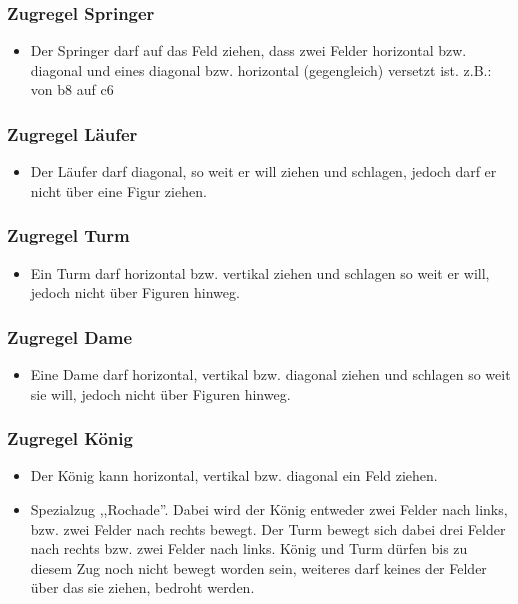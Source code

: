 \documentclass[12pt,a4paper]{article}
\begin{document}
\subsubsection{Zugregel Springer}
\label{SUBSUBSEC:JUMPER}
\begin{itemize}
	\item{Der Springer darf auf das Feld ziehen, dass zwei Felder horizontal bzw. diagonal und eines diagonal bzw. horizontal (gegengleich) versetzt ist. z.B.: von  b8 auf c6}
\end{itemize}
\subsubsection{Zugregel Läufer}
\label{SUBSUBSEC:BISHOP}
\begin{itemize}
	\item{Der Läufer darf diagonal, so weit er will ziehen und schlagen, jedoch darf er nicht über eine Figur ziehen.}
\end{itemize}

\subsubsection{Zugregel Turm}
\label{SUBSUBSEC:ROOK}
\begin{itemize}
	\item{Ein Turm darf horizontal bzw. vertikal ziehen und schlagen so weit er will, jedoch nicht über Figuren hinweg.}
\end{itemize}

\subsubsection{Zugregel Dame}
\label{SUBSUBSEC:QUEEN}
\begin{itemize}
	\item{Eine Dame darf horizontal, vertikal bzw. diagonal ziehen und schlagen so weit sie will, jedoch nicht über Figuren hinweg.}
\end{itemize}

\subsubsection{Zugregel König}
\label{SUBSUBSEC:KING}
\begin{itemize}
	\item{Der König kann horizontal, vertikal bzw. diagonal ein Feld ziehen.}
	\item{Spezialzug ,,Rochade''. Dabei wird der König entweder zwei Felder nach links, bzw. zwei Felder nach rechts bewegt. Der Turm bewegt sich dabei drei Felder nach rechts bzw. zwei Felder nach links. König und Turm dürfen bis zu diesem Zug noch nicht bewegt worden sein, weiteres darf keines der Felder über das sie ziehen, bedroht werden.}
\end{itemize}
\end{document}
